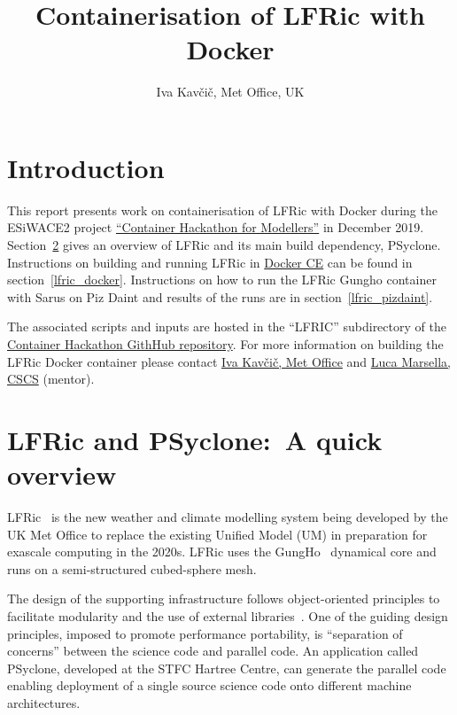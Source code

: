 \documentclass[twoside,a4paper,12pt]{article}
\title{Containerisation of LFRic with Docker}
\author{Iva Kav\v ci\v c, Met Office, UK}
\date{}
\begin{document}
\maketitle
%
%
\section{Introduction}\label{introduction}

This report presents work on containerisation of LFRic with Docker during the
ESiWACE2 project
\href{https://www.cscs.ch/events/private-events/event-detail/container-hackathon-for-modellers/}
{``Container Hackathon for Modellers''} in December 2019.
Section~\ref{lfric_overview} gives an overview of LFRic and its main build dependency,
PSyclone. Instructions on building and running LFRic in
\href{https://docs.docker.com/install/}{Docker CE} can be found in
section~\ref{lfric_docker}. Instructions on how to run the LFRic Gungho
container with Sarus on Piz Daint and results of the runs are in
section~\ref{lfric_pizdaint}.

The associated scripts and inputs are hosted in the ``LFRIC'' subdirectory of
the \href{https://github.com/eth-cscs/ContainerHackathon/tree/master}
{Container Hackathon GithHub repository}. For more information on building the
LFRic Docker container please contact
\href{iva.kavcic@metoffice.gov.uk}{Iva Kav\v ci\v c, Met Office} and
\href{https://github.com/lucamar}{Luca Marsella, CSCS} (mentor).
%
%
\section{LFRic and PSyclone:\ A quick overview}\label{lfric_overview}

LFRic~\cite{lfricpaper} is the new weather and climate modelling system being
developed by the UK Met Office to replace the existing Unified Model (UM) in
preparation for exascale computing in the 2020s. LFRic uses the
GungHo~\cite{GungHoDyn} dynamical core and runs on a semi-structured
cubed-sphere mesh.

The design of the supporting infrastructure follows object-oriented principles
to facilitate modularity and the use of external libraries~\cite{MOmodel, MOresnews}.
One of the guiding design principles, imposed to promote performance portability,
is ``separation of concerns'' between the science code and parallel code.
An application called PSyclone, developed at the STFC Hartree Centre, can
generate the parallel code enabling deployment of a single source science code
onto different machine architectures.
\end{document}
